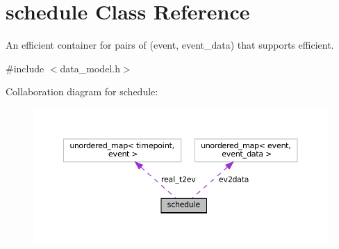 \hypertarget{classschedule}{}\section{schedule Class Reference}
\label{classschedule}


An efficient container for pairs of (event, event\+\_\+data) that supports efficient.  




{\ttfamily \#include $<$data\+\_\+model.\+h$>$}



Collaboration diagram for schedule\+:
\nopagebreak
\begin{figure}[H]
\begin{center}
\leavevmode
\includegraphics[width=350pt]{d5/d61/classschedule__coll__graph}
\end{center}
\end{figure}
